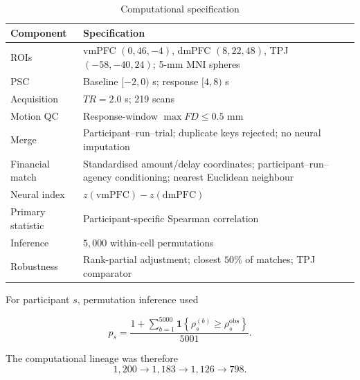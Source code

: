 \documentclass[graybox,natbib]{SNmult}
\providecommand{\1}{}
\renewcommand{\1}{\mathbbm 1}
\begin{document}
\begin{table}[htbp]
\centering
\caption{Computational specification}
\label{tab:reproducibility-specification}
\small
\begin{tabular}{p{3.2cm}p{10.2cm}}
\toprule
Component & Specification \\
\midrule
ROIs
& vmPFC \((0,46,-4)\), dmPFC \((8,22,48)\), TPJ \((-58,-40,24)\);
5-mm MNI spheres \\

PSC
& Baseline \([-2,0)\) s; response \([4,8)\) s \\

Acquisition
& \(TR=2.0\) s; 219 scans \\

Motion QC
& Response-window \(\max FD\leq0.5\) mm \\

Merge
& Participant--run--trial; duplicate keys rejected; no neural imputation \\

Financial match
& Standardised amount/delay coordinates; participant--run--agency conditioning;
nearest Euclidean neighbour \\

Neural index
& \(z(\mathrm{vmPFC})-z(\mathrm{dmPFC})\) \\

Primary statistic
& Participant-specific Spearman correlation \\

Inference
& \(5{,}000\) within-cell permutations \\

Robustness
& Rank-partial adjustment; closest \(50\%\) of matches; TPJ comparator \\
\bottomrule
\end{tabular}
\end{table}

For participant \(s\), permutation inference used

\begin{equation}
p_s
=
\frac{
1+\sum_{b=1}^{5000}
\mathbf{1}
\left\{
\rho_s^{(b)}
\geq
\rho_s^{\mathrm{obs}}
\right\}
}{
5001
}.
\label{eq:appendix-permutation-p}
\end{equation}

The computational lineage was therefore
\[
1{,}200
\rightarrow
1{,}183
\rightarrow
1{,}126
\rightarrow
798.
\]
\end{document}
